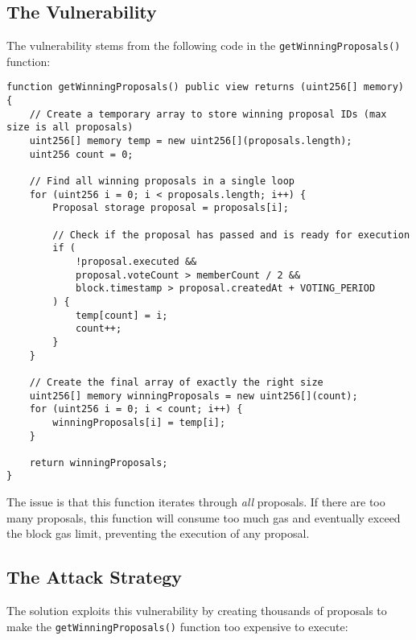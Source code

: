 \documentclass[12pt]{article}
\begin{document}
\subsection*{The Vulnerability}

The vulnerability stems from the following code in the \texttt{getWinningProposals()} function:

\noindent
\begin{minipage}{\textwidth}
\begin{lstlisting}[language=Solidity]
function getWinningProposals() public view returns (uint256[] memory) {
    // Create a temporary array to store winning proposal IDs (max size is all proposals)
    uint256[] memory temp = new uint256[](proposals.length);
    uint256 count = 0;

    // Find all winning proposals in a single loop
    for (uint256 i = 0; i < proposals.length; i++) {
        Proposal storage proposal = proposals[i];

        // Check if the proposal has passed and is ready for execution
        if (
            !proposal.executed &&
            proposal.voteCount > memberCount / 2 &&
            block.timestamp > proposal.createdAt + VOTING_PERIOD
        ) {
            temp[count] = i;
            count++;
        }
    }

    // Create the final array of exactly the right size
    uint256[] memory winningProposals = new uint256[](count);
    for (uint256 i = 0; i < count; i++) {
        winningProposals[i] = temp[i];
    }

    return winningProposals;
}
\end{lstlisting}
\end{minipage}

The issue is that this function iterates through \textit{all} proposals. If there are too many proposals, this function will consume too much gas and eventually exceed the block gas limit, preventing the execution of any proposal.

\subsection*{The Attack Strategy}

The solution exploits this vulnerability by creating thousands of proposals to make the \texttt{getWinningProposals()} function too expensive to execute:
\end{document}

